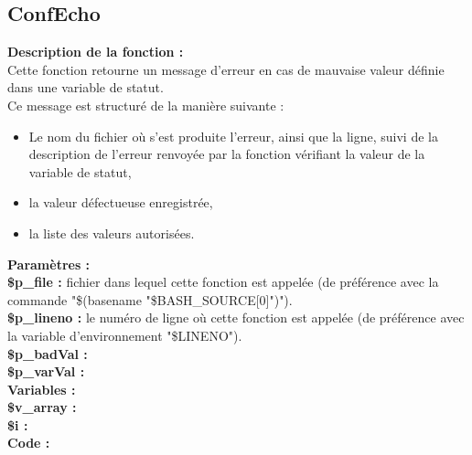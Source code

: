 \documentclass[a4paper,10pt]{article}
\begin{document}
\subsection{ConfEcho}\color{white}
\begin{flushleft}
	\textbf{Description de la fonction :}\\
   	Cette fonction retourne un message d'erreur en cas de mauvaise valeur définie dans une variable de statut.\\[1\baselineskip]
   	Ce message est structuré de la manière suivante :\\
   	\begin{itemize}
   		\item Le nom du fichier où s'est produite l'erreur, ainsi que la ligne, suivi de la description de l'erreur renvoyée par la fonction vérifiant la valeur de la variable de statut,
   		\item la valeur défectueuse enregistrée,
   		\item la liste des valeurs autorisées.\\[1\baselineskip]
   	\end{itemize}

   	\textbf{Paramètres :}\\
   	\color{orange}\textbf{\$p\_file\color{white} :} \color{white} fichier dans lequel cette fonction est appelée (de préférence avec la commande "\$(\color{gray}basename \color{white}"\color{orange}\$BASH\_SOURCE[0]\color{white}")").\\
   	\color{orange}\textbf{\$p\_lineno\color{white} :} \color{white} le numéro de ligne où cette fonction est appelée (de préférence avec la variable d'environnement "\color{orange}\$LINENO\color{white}").\\
   	\color{orange}\textbf{\$p\_badVal\color{white} :} \color{white}\\
   	\color{orange}\textbf{\$p\_varVal\color{white} :} \color{white}\\[1\baselineskip]
    
   	\textbf{Variables :}\\
   	\color{orange}\textbf{\$v\_array\color{white} :} \color{white} \\
   	\color{orange}\textbf{\$i\color{white} :} \color{white}\\[1\baselineskip]

    \textbf{Code :}\\
\end{flushleft}

\color{green}
\end{document}
